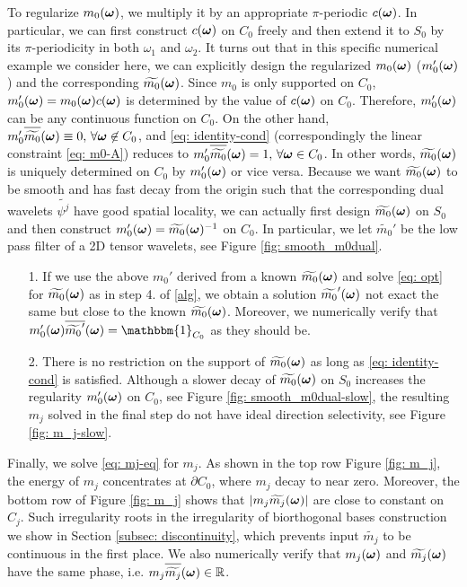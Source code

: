 To regularize $m_0(\boldsymbol{\omega})$, we multiply it by an appropriate $\pi$-periodic $c(\boldsymbol{\omega})$. In particular, we can first construct $c(\boldsymbol{\omega})$ on $C_0$ freely and then extend it to $S_0$ by its $\pi$-periodicity in both $\omega_1$ and $\omega_2$. It turns out that in this specific numerical example we consider here, we can explicitly design the regularized $m_0(\boldsymbol{\omega})$ ($m_0'(\boldsymbol{\omega})$) and the corresponding $\widetilde{m_{0}}(\boldsymbol{\omega})$. Since $m_0$ is only supported on $C_0$, $m_0'(\boldsymbol{\omega}) = m_0(\boldsymbol{\omega})c(\boldsymbol{\omega})$ is determined by the value of $c(\boldsymbol{\omega})$ on $C_0$. Therefore, $m_0'(\boldsymbol{\omega})$ can be any continuous function on $C_0$. On the other hand, $m_0'\sbarm{0}\equiv 0,\,\forall\V{\omega}\not\in C_0$, and \eqref{eq: identity-cond} (correspondingly the linear constraint \eqref{eq: m0-A}) reduces to $m_0'\sbarm{0} = 1,\, \forall\V{\omega}\in C_0$. In other words, $\widetilde{m_{0}}(\boldsymbol{\omega})$ is uniquely determined on $C_0$ by $m_0'(\boldsymbol{\omega})$ or vice versa. Because we want $\widetilde{m_{0}}(\boldsymbol{\omega})$ to be smooth and has fast decay from the origin such that the corresponding dual wavelets $\widetilde{\psi^j}$ have good spatial locality, we can actually first design $\widetilde{m_{0}}(\boldsymbol{\omega})$ on $S_0$ and then construct $m_0'(\boldsymbol{\omega}) = \widetilde{m_{0}}(\boldsymbol{\omega})^{-1}$ on $C_0$.
In particular, we let $\widetilde{m_0}'$ be the low pass filter of a 2D tensor wavelets, see Figure \ref{fig: smooth_m0dual}.

\begin{itemize}
\item[1.]If we use the above $m_0'$ derived from a known $\widetilde{m_{0}}(\boldsymbol{\omega})$ and solve \eqref{eq: opt} for $\widetilde{m_{0}}(\boldsymbol{\omega})$ as in step 4. of \ref{alg}, we obtain a solution $\widetilde{m_0}'(\boldsymbol{\omega})$ not exact the same but close to the known $\widetilde{m_{0}}(\boldsymbol{\omega})$. Moreover, we numerically verify that $m_0'(\V{\omega})\overlinespace{\widetilde{m_0}'}(\V{\omega})=\mathbbm{1}_{C_0}$ as they should be.
\item[2.]There is no restriction on the support of $\widetilde{m_{0}}(\boldsymbol{\omega})$ as long as \eqref{eq: identity-cond} is satisfied. Although a slower decay of $\widetilde{m_{0}}(\boldsymbol{\omega})$ on $S_0$ increases the regularity $m_0'(\boldsymbol{\omega})$ on $C_0$, see Figure \ref{fig: smooth_m0dual-slow}, the resulting $m_j$ solved in the final step do not have ideal direction selectivity, see Figure \ref{fig: m_j-slow}.
\end{itemize}

Finally, we solve \eqref{eq: mj-eq} for $m_j$. As shown in the top row Figure \ref{fig: m_j}, the energy of $m_j$ concentrates at $\partial C_0$, where $m_j$ decay to near zero. Moreover, the bottom row of Figure \ref{fig: m_j} shows that $|m_j\widetilde{m_{j}}(\boldsymbol{\omega})|$ are close to constant on $C_j$. Such irregularity roots in the irregularity of biorthogonal bases construction we show in Section \ref{subsec: discontinuity}, which prevents input $\widetilde{m_j}$ to be continuous in the first place.
 We also numerically verify that $m_j(\boldsymbol{\omega})$ and $\widetilde{m_{j}}(\boldsymbol{\omega})$ have the same phase, i.e. $m_j\sbarm{j}\in \mathbb{R}$.

